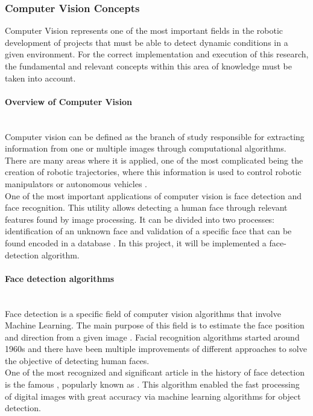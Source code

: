 \documentclass[11pt]{report} %
\newcommand{\subsubsubsection}[1]{\paragraph{#1}\mbox{}\\}
\begin{document}
\subsubsection{Computer Vision Concepts}

Computer Vision represents one of the most important fields in the robotic development of projects that must be able to detect dynamic conditions in a given environment. For the correct implementation and execution of this research, the fundamental and relevant concepts within this area of knowledge must be taken into account.\\

\subsubsubsection{Overview of Computer Vision}

Computer vision can be defined as the branch of study responsible for extracting information from one or multiple images through computational algorithms. There are many areas where it is applied, one of the most complicated being the creation of robotic trajectories, where this information is used to control robotic manipulators or autonomous vehicles \citep{cite_computer_vision_advances_in_computers}.\\

One of the most important applications of computer vision is face detection and face recognition. This utility allows detecting a human face through relevant features found by image processing. It can be divided into two processes: identification of an unknown face and validation of a specific face that can be found encoded in a database \citep{cite_computer_vision_techniques_for_face_recognition}. In this project, it will be implemented a face-detection algorithm.\\

\subsubsubsection{Face detection algorithms}

Face detection is a specific field of computer vision algorithms that involve Machine Learning. The main purpose of this field is to estimate the face position and direction from a given image \citep{cite_face_detection_science_direct_article}. Facial recognition algorithms started around 1960s and there have been multiple improvements of different approaches to solve the objective of detecting human faces.\\

One of the most recognized and significant article in the history of face detection is the famous , popularly known as  \citep{cite_viola_jones_face_detection_algorithm}. This algorithm enabled the fast processing of digital images with great accuracy via machine learning algorithms for object detection.\\
\end{document}
